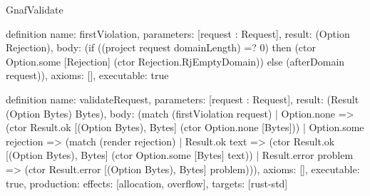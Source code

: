 \begin{lexlean}{GnafValidate}
\begin{semanticmodule}
definition{
  name: firstViolation,
  parameters: [request : Request],
  result: (Option Rejection),
  body: (if ((project request domainLength) =? 0) then (ctor Option.some [Rejection] (ctor Rejection.RjEmptyDomain)) else (afterDomain request)),
  axioms: [],
  executable: true
}

definition{
  name: validateRequest,
  parameters: [request : Request],
  result: (Result (Option Bytes) Bytes),
  body: (match (firstViolation request)
    | Option.none => (ctor Result.ok [(Option Bytes), Bytes] (ctor Option.none [Bytes]))
    | Option.some rejection => (match (render rejection)
      | Result.ok text => (ctor Result.ok [(Option Bytes), Bytes] (ctor Option.some [Bytes] text))
      | Result.error problem => (ctor Result.error [(Option Bytes), Bytes] problem))),
  axioms: [],
  executable: true,
  production: {effects: [allocation, overflow], targets: [rust-std]}
}
\end{semanticmodule}
\end{lexlean}
